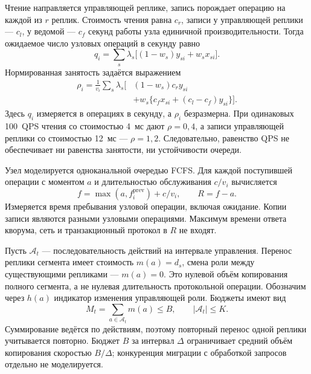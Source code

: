 \documentclass{misisarticle}
\begin{document}
Чтение направляется управляющей реплике, запись порождает операцию на каждой из $r$ реплик. Стоимость чтения равна $c_r$, записи у управляющей реплики --- $c_l$, у ведомой --- $c_f$ секунд работы узла единичной производительности. Тогда ожидаемое число узловых операций в секунду равно
\begin{equation}
q_i=\sum_s\lambda_s\bigl[(1-w_s)y_{si}+w_sx_{si}\bigr].
\label{eq:qps}
\end{equation}
Нормированная занятость задаётся выражением
\begin{equation}
\begin{aligned}
\rho_i=\frac{1}{v_i}\sum_s\lambda_s\bigl[{}&(1-w_s)c_ry_{si}\\
&+w_s\{c_fx_{si}+(c_l-c_f)y_{si}\}\bigr].
\end{aligned}
\label{eq:rho}
\end{equation}
Здесь $q_i$ измеряется в операциях в секунду, а $\rho_i$ безразмерна. При одинаковых 100~QPS чтения со стоимостью 4~мс дают $\rho=0{,}4$, а записи управляющей реплики со стоимостью 12~мс --- $\rho=1{,}2$. Следовательно, равенство QPS не обеспечивает ни равенства занятости, ни устойчивости очереди.

Узел моделируется одноканальной очередью FCFS. Для каждой поступившей операции с моментом $a$ и длительностью обслуживания $c/v_i$ вычисляется
\begin{equation}
f=\max(a,f_i^{\mathrm{prev}})+c/v_i,\qquad R=f-a.
\label{eq:queue}
\end{equation}
Измеряется время пребывания узловой операции, включая ожидание. Копии записи являются разными узловыми операциями. Максимум времени ответа кворума, сеть и транзакционный протокол в $R$ не входят.

Пусть $\mathcal A_t$ --- последовательность действий на интервале управления. Перенос реплики сегмента имеет стоимость $m(a)=d_s$, смена роли между существующими репликами --- $m(a)=0$. Это нулевой объём копирования полного сегмента, а не нулевая длительность протокольной операции. Обозначим через $h(a)$ индикатор изменения управляющей роли. Бюджеты имеют вид
\begin{equation}
M_t=\sum_{a\in\mathcal A_t}m(a)\le B,\qquad |\mathcal A_t|\le K.
\label{eq:budget}
\end{equation}
Суммирование ведётся по действиям, поэтому повторный перенос одной реплики учитывается повторно. Бюджет $B$ за интервал $\Delta$ ограничивает средний объём копирования скоростью $B/\Delta$; конкуренция миграции с обработкой запросов отдельно не моделируется.
\end{document}
